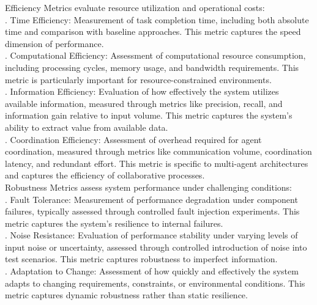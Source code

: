 Efficiency Metrics evaluate resource utilization and operational costs:\\ . Time Efficiency: Measurement of task completion time, including both absolute time and comparison with baseline approaches. This metric captures the speed dimension of performance.\\ . Computational Efficiency: Assessment of computational resource consumption, including processing cycles, memory usage, and bandwidth requirements. This metric is particularly important for resource-constrained environments.\\ . Information Efficiency: Evaluation of how effectively the system utilizes available information, measured through metrics like precision, recall, and information gain relative to input volume. This metric captures the system's ability to extract value from available data.\\ . Coordination Efficiency: Assessment of overhead required for agent coordination, measured through metrics like communication volume, coordination latency, and redundant effort. This metric is specific to multi-agent architectures and captures the efficiency of collaborative processes.\\ \newline
Robustness Metrics assess system performance under challenging conditions:\\ . Fault Tolerance: Measurement of performance degradation under component failures, typically assessed through controlled fault injection experiments. This metric captures the system's resilience to internal failures.\\ . Noise Resistance: Evaluation of performance stability under varying levels of input noise or uncertainty, assessed through controlled introduction of noise into test scenarios. This metric captures robustness to imperfect information.\\ . Adaptation to Change: Assessment of how quickly and effectively the system adapts to changing requirements, constraints, or environmental conditions. This metric captures dynamic robustness rather than static resilience.\\ \newline
